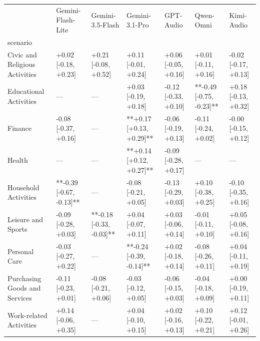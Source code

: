 \begin{tabular}{lllllll}
\toprule
 & Gemini-Flash-Lite & Gemini-3.5-Flash & Gemini-3.1-Pro & GPT-Audio & Qwen-Omni & Kimi-Audio \\
scenario &  &  &  &  &  &  \\
\midrule
Civic and Religious Activities & +0.02 [-0.18, +0.23] & +0.21 [-0.08, +0.52] & +0.11 [-0.01, +0.24] & +0.06 [-0.05, +0.16] & +0.01 [-0.11, +0.16] & -0.02 [-0.17, +0.13] \\
Educational Activities & — & — & +0.03 [-0.19, +0.18] & -0.12 [-0.33, +0.10] & **-0.49 [-0.75, -0.23]** & +0.18 [-0.13, +0.32] \\
Finance & -0.08 [-0.37, +0.16] & — & **+0.17 [+0.13, +0.29]** & -0.06 [-0.19, +0.13] & -0.11 [-0.24, +0.02] & -0.00 [-0.15, +0.12] \\
Health & — & — & **+0.14 [+0.12, +0.27]** & -0.09 [-0.28, +0.17] & — & — \\
Household Activities & **-0.39 [-0.67, -0.13]** & — & -0.08 [-0.21, +0.05] & -0.13 [-0.29, +0.03] & +0.10 [-0.38, +0.25] & -0.10 [-0.35, +0.16] \\
Leisure and Sports & -0.09 [-0.28, +0.03] & **-0.18 [-0.33, -0.03]** & +0.04 [-0.07, +0.11] & +0.03 [-0.06, +0.14] & -0.01 [-0.11, +0.10] & +0.05 [-0.08, +0.16] \\
Personal Care & -0.03 [-0.27, +0.22] & — & **-0.24 [-0.39, -0.14]** & +0.02 [-0.18, +0.14] & -0.08 [-0.26, +0.11] & +0.04 [-0.11, +0.19] \\
Purchasing Goods and Services & -0.11 [-0.23, +0.01] & -0.08 [-0.21, +0.06] & -0.03 [-0.12, +0.05] & -0.06 [-0.15, +0.03] & -0.04 [-0.18, +0.09] & +0.00 [-0.19, +0.11] \\
Work-related Activities & +0.14 [-0.06, +0.35] & — & +0.04 [-0.10, +0.15] & +0.02 [-0.16, +0.13] & +0.10 [-0.22, +0.21] & +0.12 [-0.01, +0.26] \\
\bottomrule
\end{tabular}
